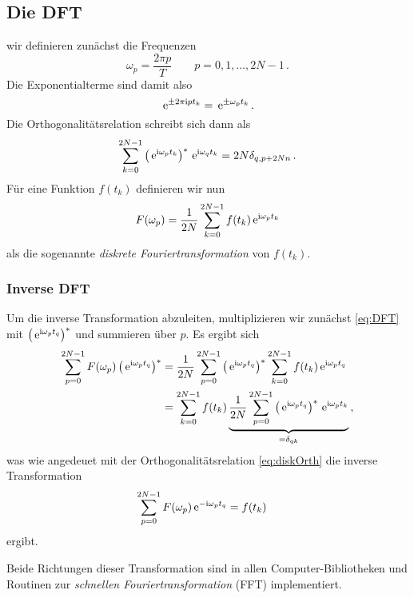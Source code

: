 \documentclass[paper=a4, fontsize=11.0pt, abstractoff, DIV12]{scrartcl}
\begin{document}
\subsection{Die DFT}

wir definieren zunächst die Frequenzen
\begin{equation}
\omega_p = \frac{2\pi p }{T}\qquad p=0,1,\dots,2N-1\,.
\end{equation}
Die Exponentialterme sind damit also
\begin{equation*}
\,{\mathrm{e}}^{\pm 2\pi\mathrm{i} pt_k} = \,{\mathrm{e}}^{\pm \omega_p t_k}\,.
\end{equation*}
Die Orthogonalitätsrelation schreibt sich dann als
\begin{equation}
\sum\limits_{k=0}^{2N-1} \left(\,{\mathrm{e}}^{\mathrm{i} \omega_p t_k}\right)^* \,{\mathrm{e}}^{\mathrm{i} \omega_q t_k} = 2N\delta_{q,p+2Nn}\,.
\end{equation}
Für eine Funktion $f(t_k)$ definieren wir nun
\begin{equation}
F(\omega_p) = \frac{1}{2N}\sum\limits_{k=0}^{2N-1}f(t_k)\,{\mathrm{e}}^{\mathrm{i}\omega_pt_k}
\label{eq:DFT}
\end{equation}
als die sogenannte \emph{diskrete Fouriertransformation} von $f(t_k)$.

\subsubsection{Inverse DFT}

Um die inverse Transformation abzuleiten, multiplizieren wir zunächst \eqref{eq:DFT}
mit $\left(\,{\mathrm{e}}^{\mathrm{i}\omega_p t_q}\right)^*$ und summieren über $p$. Es ergibt sich
\begin{align}
\sum\limits_{p=0}^{2N-1}F(\omega_p)\left(\,{\mathrm{e}}^{\mathrm{i}\omega_p t_q}\right)^* &= \frac{1}{2N} \sum\limits_{p=0}^{2N-1} \left(\,{\mathrm{e}}^{\mathrm{i}\omega_p t_q}\right)^* \sum\limits_{k=0}^{2N-1}f(t_k) \,{\mathrm{e}}^{\mathrm{i}\omega_p t_q}\nonumber\\
&=\sum\limits_{k=0}^{2N-1}f(t_k) \underbrace{\frac{1}{2N}\sum\limits_{p=0}^{2N-1}\left(\,{\mathrm{e}}^{\mathrm{i}\omega_p t_q}\right)^*\,{\mathrm{e}}^{\mathrm{i}\omega_p t_k} }_{=\delta_{qk}}\,,
\end{align}
was wie angedeuet mit der Orthogonalitätsrelation \eqref{eq:diskOrth} die inverse Transformation
\begin{align}
\sum\limits_{p=0}^{2N-1}F(\omega_p)\,{\mathrm{e}}^{-\mathrm{i}\omega_p t_q} &= f(t_k)
\end{align}
ergibt.

Beide Richtungen dieser Transformation sind in allen Computer-Bibliotheken
und Routinen zur \emph{schnellen Fouriertransformation} (FFT) implementiert.
\end{document}
